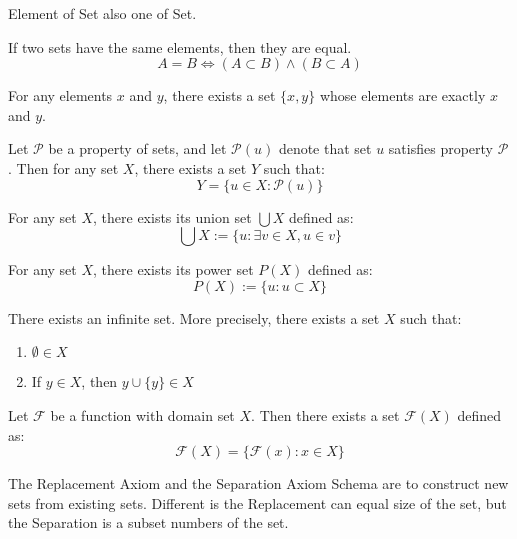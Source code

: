 \documentclass[11pt,lang=en]{elegantbook}
\begin{document}
\begin{remark}
  Element of Set also one of Set.
\end{remark}

\begin{axiom}
  If two sets have the same elements, then they are equal.
  \[
    A=B \iff (A \subset B) \land (B \subset A)
  \]
\end{axiom}

\begin{axiom}
  For any elements $x$ and $y$, there exists a set $\{x,y\}$ whose elements are exactly $x$ and $y$.
\end{axiom}

\begin{axiom}
  Let $\mathcal{P} $ be a property of sets, and let $\mathcal{P}(u)$ denote that set $u$ satisfies property $\mathcal{P} $. Then for any set $X$, there exists a set $Y$ such that:
  \[
    Y = \{u \in X : \mathcal{P}(u)\}
  \]
\end{axiom}

\begin{axiom}
  For any set $X$, there exists its union set $\bigcup X$ defined as:
  \[
    \bigcup X := \{u : \exists v \in X, u \in v\}
  \]
\end{axiom}

\begin{axiom}
  For any set $X$, there exists its power set $P(X)$ defined as:
  \[
    P(X) := \{u : u \subset X\}
  \]
\end{axiom}

\begin{axiom}
  There exists an infinite set. More precisely, there exists a set $X$ such that:
  \begin{enumerate}
    \item $\emptyset \in X$
    \item If $y \in X$, then $y \cup \{y\} \in X$
  \end{enumerate}
\end{axiom}

\begin{axiom}
  Let $\mathcal{F}$ be a function with domain set $X$. Then there exists a set $\mathcal{F}(X)$ defined as:
  \[
    \mathcal{F}(X) = \{\mathcal{F}(x) : x \in X\}
  \]
\end{axiom}

\begin{remark}
  The Replacement Axiom and the Separation Axiom Schema are to construct new sets from existing sets. Different is the Replacement can equal size of the set, but the Separation is a subset numbers of the set.
\end{remark}
\end{document}
